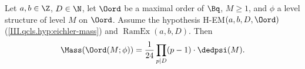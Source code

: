 Let $a,b\in\Z$, $D\in\N$, let $\Oord$ be a maximal order of $\Bq$, $M\ge1$, and $\phi$ a level structure of level $M$ on $\Oord$.
Assume the hypothesis H-EM$(a,b,D,\Oord)$ (\cref{III.qcls.hyp:eichler-mass}) and $\operatorname{RamEx}(a,b,D)$. Then
\[
  \Mass(\Oord(M;\phi))=\frac1{24}\prod_{p\mid D}(p-1)\cdot\dedpsi(M).
\]
